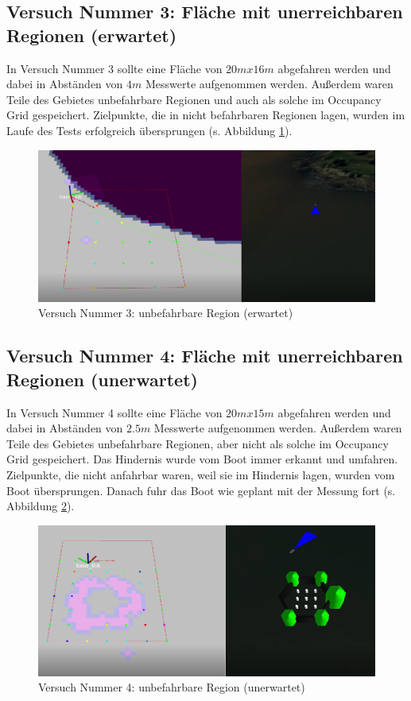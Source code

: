 \documentclass[11pt]{article}
\begin{document}
\subsection{Versuch Nummer 3: Fläche mit unerreichbaren Regionen (erwartet)}
In Versuch Nummer 3 sollte eine Fläche von $20mx16m$ abgefahren werden und dabei in Abständen von $4m$ Messwerte aufgenommen werden. Außerdem waren Teile des Gebietes unbefahrbare Regionen und auch als solche im Occupancy Grid gespeichert. Zielpunkte, die in nicht befahrbaren Regionen lagen, wurden im Laufe des Tests erfolgreich übersprungen (s. Abbildung \ref{Versuch3}).

\begin{figure}[H]
	\centering
	\includegraphics[width=0.8\linewidth]{versuch3.png}
	\caption{Versuch Nummer 3: unbefahrbare Region (erwartet)}
	\label{Versuch3}
\end{figure}

\subsection{Versuch Nummer 4: Fläche mit unerreichbaren Regionen (unerwartet)}
In Versuch Nummer 4 sollte eine Fläche von $20mx15m$ abgefahren werden und dabei in Abständen von $2.5m$ Messwerte aufgenommen werden. Außerdem waren Teile des Gebietes unbefahrbare Regionen, aber nicht als solche im Occupancy Grid gespeichert. Das Hindernis wurde vom Boot immer erkannt und umfahren. Zielpunkte, die nicht anfahrbar waren, weil sie im Hindernis lagen, wurden vom Boot übersprungen. Danach fuhr das Boot wie geplant mit der Messung fort (s. Abbildung \ref{Versuch4}).

\begin{figure}[H]
	\centering
	\includegraphics[width=0.8\linewidth]{versuch4.png}
	\caption{Versuch Nummer 4: unbefahrbare Region (unerwartet)}
	\label{Versuch4}
\end{figure}
\end{document}
